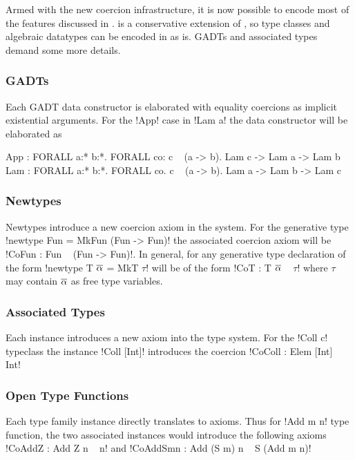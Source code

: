 \documentclass[manuscript,screen,nonacm]{acmart}
\begin{document}
Armed with the new coercion infrastructure, it is now possible to encode most of the features discussed in . \SFC is a conservative extension of \SF, so type classes and algebraic datatypes can be encoded in \SFC as is. GADTs and associated types demand some more details.

\subsubsection{GADTs}
Each GADT data constructor is elaborated with equality coercions as implicit existential arguments.
For the !App! case in !Lam a! the data constructor will be elaborated as
\begin{code}
  App : FORALL a:* b:*. FORALL co: c ~ (a -> b). Lam c -> Lam a -> Lam b
  Lam : FORALL a:* b:*. FORALL co. c ~ (a -> b). Lam a -> Lam b -> Lam c
\end{code}

\subsubsection{Newtypes}
Newtypes introduce a new coercion axiom in the system. For the generative type !newtype Fun = MkFun (Fun -> Fun)!
the associated coercion axiom will be !CoFun : Fun ~ (Fun -> Fun)!. In general, for any generative type declaration of the form !newtype T $\overline{\alpha}$ = MkT $\tau$! will be of the form !CoT : T $\overline{\alpha}$ ~ $\tau$! where $\tau$ may contain $\overline{\alpha}$ as free type variables.

\subsubsection{Associated Types}
Each instance introduces a new axiom into the type system. For the !Coll c! typeclass the instance !Coll [Int]! introduces the coercion !CoColl : Elem [Int] ~ Int!

\subsubsection{Open Type Functions}
Each type family instance directly translates to axioms. Thus for !Add m n! type function, the two associated instances would introduce the following axioms !CoAddZ : Add Z n ~ n! and !CoAddSmn : Add (S m) n ~ S (Add m n)!


\section{\SFR}\label{sec:sfr} %
\end{document}
